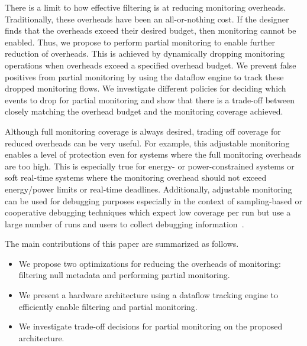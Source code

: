 There is a limit to how effective filtering is at reducing monitoring overheads. 
Traditionally, these overheads have been an all-or-nothing cost. If the
designer finds that the overheads exceed their desired budget, then monitoring
cannot be enabled.  
Thus, we propose to perform partial monitoring to enable further reduction of overheads.
 This is achieved by dynamically dropping
monitoring operations when overheads exceed a specified overhead budget. We prevent false
positives from partial monitoring by using the dataflow engine to track these dropped
monitoring flows. We investigate different policies for deciding which events
to drop for partial monitoring and show that there is a trade-off between
closely matching the overhead budget and the monitoring coverage achieved.

Although full monitoring coverage is always desired, trading off coverage for
reduced overheads can be very useful. For example, this adjustable
monitoring enables a level of protection even for systems where the full
monitoring overheads are too high. This is especially true for energy- or
power-constrained systems or soft real-time systems where the monitoring
overhead should not exceed energy/power limits or real-time deadlines.
Additionally, adjustable monitoring can be used for debugging purposes
especially in the context of sampling-based or cooperative debugging techniques
which expect low coverage per run but use a large number of runs and users to
collect debugging information~\cite{liblit-pldi05, chilimbi-asplos04,
greathouse-cgo11}. 

The main contributions of this paper are summarized as follows.
\begin{itemize}
  \item We propose two optimizations for reducing the overheads of monitoring: filtering null metadata and performing partial monitoring.
  \item We present a hardware architecture using a dataflow tracking engine to efficiently enable filtering and partial monitoring.
  \item We investigate trade-off decisions for partial monitoring on the proposed architecture.
\end{itemize}

